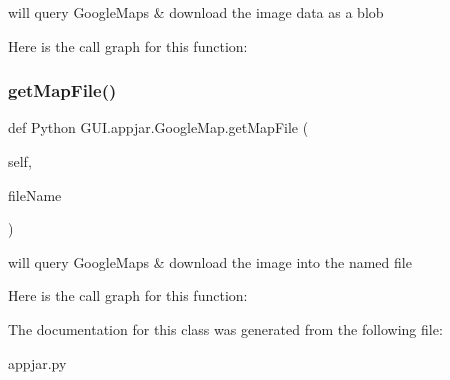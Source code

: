 \begin{DoxyVerb}will query GoogleMaps & download the image data as a blob \end{DoxyVerb}
 Here is the call graph for this function\+:
\mbox{\label{class_python_01_g_u_i_1_1appjar_1_1_google_map_ab38acb7dfeef6d9a8370d00b39bc2c33}} 
\subsubsection{\texorpdfstring{get\+Map\+File()}{getMapFile()}}
{\footnotesize\ttfamily def Python G\+U\+I.\+appjar.\+Google\+Map.\+get\+Map\+File (\begin{DoxyParamCaption}\item[{}]{self,  }\item[{}]{file\+Name }\end{DoxyParamCaption})}

\begin{DoxyVerb}will query GoogleMaps & download the image into the named file \end{DoxyVerb}
 Here is the call graph for this function\+:


The documentation for this class was generated from the following file\+:\begin{DoxyCompactItemize}
\item 
appjar.\+py\end{DoxyCompactItemize}
